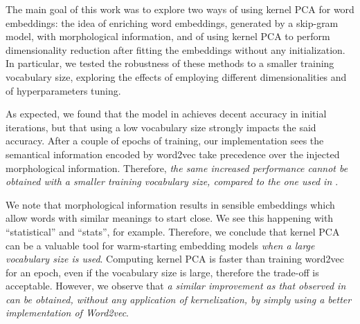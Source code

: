 The main goal of this work was to explore two ways of using kernel PCA for word embeddings: the idea of enriching word embeddings, generated by a skip-gram model, with morphological information, and of using kernel PCA to perform dimensionality reduction after fitting the embeddings without any initialization. In particular, we tested the robustness of these methods to a smaller training vocabulary size, exploring the effects of employing different dimensionalities and of hyperparameters tuning. 

As expected, we found that the model in \cite{gupta_improving_2019} achieves decent accuracy in initial iterations, but that using a low vocabulary size strongly impacts the said accuracy. After a couple of epochs of training, our implementation sees the semantical information encoded by word2vec take precedence over the injected morphological information.
Therefore, \emph{the same increased performance cannot be obtained with a smaller training vocabulary size, compared to the one used in \cite{gupta_improving_2019}}.


We note that morphological information results in sensible embeddings which allow words with similar meanings to start close. We see this happening with ``statistical'' and ``stats'', for example. Therefore, we conclude that kernel PCA can be a valuable tool for warm-starting embedding models \emph{when a large vocabulary size is used}.
Computing kernel PCA is faster than training word2vec for an epoch, even if the vocabulary size is large, therefore the trade-off is acceptable.
However, we observe that \emph{a similar improvement as that observed in \cite{gupta_improving_2019} can be obtained, without any application of kernelization, by simply using a better implementation of Word2vec}.


